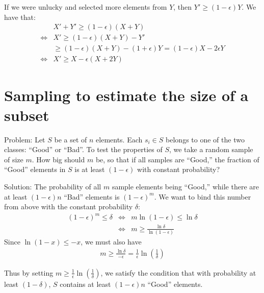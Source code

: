 \documentclass[11pt,twocolumn]{MyTightStyle}
\theoremstyle{plain}
\theoremstyle{definition}
\theoremstyle{remark}
\numberwithin{equation}{section}
\begin{document}
If we were unlucky and selected more elements from $Y$, then $Y' \geq
(1-\epsilon)Y$. We have that:
\begin{align*}
                  & X' + Y'  \geq (1-\epsilon)(X+Y)\\
  \Leftrightarrow & X'       \geq (1-\epsilon)(X+Y)-Y'\\
                  &          \geq (1-\epsilon)(X+Y)-(1+\epsilon)Y = (1-\epsilon)X -2\epsilon Y\\
  \Leftrightarrow & X'       \geq X -\epsilon(X+2Y)
\end{align*}




















\appendices
\section{Sampling to estimate the size of a subset}
\label{sec:sampling}
Problem: Let $S$ be a set of $n$ elements. Each $s_i \in S$ belongs to
one of the two classes: ``Good'' or ``Bad''. To test the properties
of $S$, we take a random sample of size $m$. How big should $m$ be, so
that if all samples are ``Good,'' the fraction of 
``Good''  elements in $S$ is at least $(1-\epsilon)$ with
constant probability?

Solution: The probability of all $m$ sample elements being ``Good,'' while
there are at least $(1-\epsilon)n$ ``Bad'' elements is
$(1-\epsilon)^{m}$. We want to bind this number from above with the
constant probability $\delta$:
\begin{eqnarray*}
(1-\epsilon)^{m} \leq \delta &\Leftrightarrow& m\ln{(1-\epsilon)} \leq \ln{\delta}\\
&\Leftrightarrow& m \geq \frac{\ln{\delta}}{\ln{(1-\epsilon)}}
\end{eqnarray*}
Since $\ln{(1-x)} \leq -x$, we must also have
\begin{eqnarray*}
m \geq \frac{\ln{\delta}}{-\epsilon} = \frac{1}{\epsilon}\ln{(\frac{1}{\delta})}
\end{eqnarray*}

Thus by setting $m \geq \frac{1}{\epsilon}\ln{(\frac{1}{\delta})}$, we
satisfy the condition that with probability at least $(1-\delta)$, $S$
contains at least $(1-\epsilon)n$ ``Good'' elements.
\end{document}
